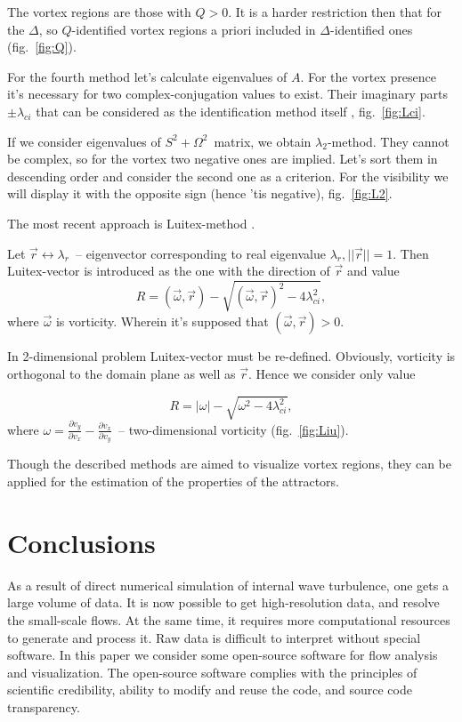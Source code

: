 \documentclass[a4wide,fontsize=12pt]{article}
\begin{document}
The vortex regions are those with $Q>0$. It is a harder restriction then that for the $\Delta$, so $Q$-identified vortex regions a priori included in $\Delta$-identified ones (fig.~\ref{fig:Q}).

For the fourth method let's calculate eigenvalues of $A$. For the vortex presence it's necessary for two complex-conjugation values to exist. Their imaginary parts $\pm\lambda_{ci}$ that can be considered as the identification method itself \cite{vortex}, fig.~\ref{fig:Lci}.

If we consider eigenvalues of $S^2+\Omega^2$~matrix, we obtain $\lambda_2$-method. They cannot be complex, so for the vortex two negative ones are implied. Let's sort them in descending order and consider the second one as a criterion\cite{vortex,Hussain}. For the visibility we will display it with the opposite sign (hence 'tis negative), fig.~\ref{fig:L2}.

The most recent approach is Luitex-method \cite{vortex}.

Let $\vec r \longleftrightarrow \lambda_r$~-- eigenvector corresponding to real eigenvalue $\lambda_r, ||\vec r||=1$. Then Luitex-vector is introduced as the one with the direction of $\vec r$ and value
 $$R=(\vec \omega,\vec r)-\sqrt{(\vec \omega,\vec r)^2-4\lambda_{ci}^2},$$\noindent where $\vec \omega$ is vorticity. Wherein it's supposed that $(\vec \omega,\vec r)>0$.
 
 In 2-dimensional problem Luitex-vector must be re-defined. Obviously, vorticity is orthogonal to the domain plane as well as $\vec r$. Hence we consider only value
 
 $$R=|\omega|- \sqrt{\omega^2-4\lambda_{ci}^2},$$\noindent where $\omega=\frac{\partial v_y}{\partial v_x}-\frac{\partial v_x}{\partial v_y}$~-- two-dimensional vorticity (fig.~\ref{fig:Liu}).

Though the described methods are aimed to visualize vortex regions, they can be applied for the estimation of the properties of the attractors.

\section{Conclusions}

As a result of direct numerical simulation of internal wave turbulence, one gets a large volume of data. It is now possible to get high-resolution data, and resolve the small-scale flows. At the same time, it requires more computational resources to generate and process it. Raw data is difficult to interpret without special software. In this paper we consider some open-source software for flow analysis and visualization. The open-source software complies with the principles of scientific credibility, ability to modify and reuse the code, and source code transparency.
\end{document}
